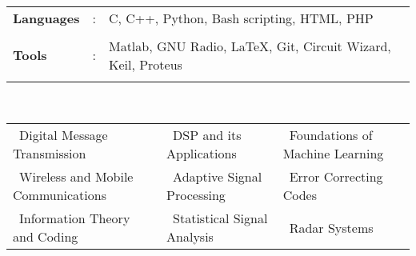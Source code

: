 \documentclass[10pt]{article}
\newcommand\hs{1.3mm}		%
\begin{document}
\colorbox{bl}{}\\
\begin{tabular}{m{1in}m{0.20in}m{4.5in}}
	\\[-3mm]
	\hspace{\hs} \hspace{0.12cm}\textbf{\textbf{Languages}} &: & {{C, C++, Python, Bash scripting, HTML, PHP}} \\
	\\[-3.5mm]
	\hspace{\hs} \hspace{0.12cm}\textbf{\textbf{Tools}} &: & {Matlab, GNU Radio, \LaTeX, Git, Circuit Wizard, Keil, Proteus}\\
	\\[-4mm]
\end{tabular}\\

	\colorbox{bl}{}%
	\vspace{0.15cm} 
	
	\begin{tabular}{ l l l }
		\hspace{0.55cm}\textbullet\ Digital Message Transmission &  \textbullet\ DSP and its Applications & \textbullet\ Foundations of Machine Learning\vspace{0.1cm}\\
		\hspace{0.55cm}\textbullet\ Wireless and Mobile Communications & \textbullet\ Adaptive Signal Processing & \textbullet\ Error Correcting Codes\vspace{0.1cm}\\
		\hspace{0.55cm}\textbullet\ Information Theory and Coding & \textbullet\ Statistical Signal Analysis  & \textbullet\ Radar Systems\\ 
		
	\end{tabular}
	\setlength{\tabcolsep}{0.1cm}
	

	\vspace{0.15cm}
	

\colorbox{bl}{}
\end{document}

